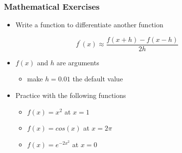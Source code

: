 \documentclass[xcolor=table,10pt,final]{beamer}
\begin{document}
\begin{frame}
  \frametitle{Mathematical Exercises}
  \begin{itemize}
    \item Write a function to differentiate another function
  \end{itemize}
\begin{equation*}
  f^{\prime}(x) \approx \frac{f(x+h) - f(x-h)}{2h}
\end{equation*}
\begin{itemize}
  \item<2-> $f(x)$ and $h$ are arguments
    \begin{itemize}
      \item make $h=0.01$ the default value
    \end{itemize}
  \item<2-> Practice with the following functions
    \begin{itemize}
      \item $f(x) = x^2$ at $x=1$
      \item $f(x) = cos(x)$ at $x=2\pi$
      \item $f(x) = e^{-2x^2}$ at $x=0$
    \end{itemize}
\end{itemize}
\end{frame}
\end{document}
